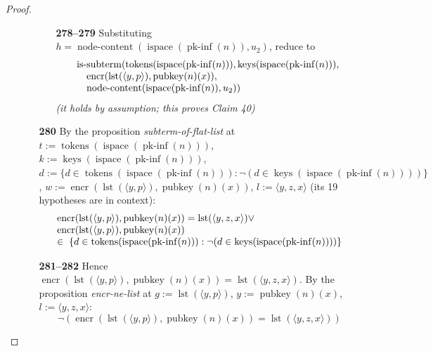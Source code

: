 \documentclass[11pt]{article}
\theoremstyle{plain}
\begin{document}
\begin{proof}
\begin{itemize}[leftmargin=2.8em, itemsep=4pt, parsep=1pt]
\begin{itemize}[leftmargin=2.8em, itemsep=4pt, parsep=1pt]
\begin{itemize}[leftmargin=2.8em, itemsep=4pt, parsep=1pt]
  \item[\textbf{278--279}] Substituting $h = \operatorname{node\text{-}content}(\operatorname{ispace}(\operatorname{pk\text{-}inf}(n)), u_{2})$, reduce to
\begin{equation*}
\begin{array}{@{}l@{}} \operatorname{is\text{-}subterm}(\operatorname{tokens}(\operatorname{ispace}(\operatorname{pk\text{-}inf}(n))), \operatorname{keys}(\operatorname{ispace}(\operatorname{pk\text{-}inf}(n))), \\ \quad \operatorname{encr}(\operatorname{lst}(\langle y, p \rangle), \operatorname{pubkey}(n)(x)), \\ \quad \operatorname{node\text{-}content}(\operatorname{ispace}(\operatorname{pk\text{-}inf}(n)), u_{2})) \end{array}
\end{equation*}
  \emph{(it holds by assumption; this proves Claim 40)}
  \end{itemize}
  \item[\textbf{280}] By the proposition \emph{subterm-of-flat-list} at $t := \operatorname{tokens}(\operatorname{ispace}(\operatorname{pk\text{-}inf}(n)))$, $k := \operatorname{keys}(\operatorname{ispace}(\operatorname{pk\text{-}inf}(n)))$, $d := \{d \in \operatorname{tokens}(\operatorname{ispace}(\operatorname{pk\text{-}inf}(n))) : \neg (d \in \operatorname{keys}(\operatorname{ispace}(\operatorname{pk\text{-}inf}(n))))\}$, $w := \operatorname{encr}(\operatorname{lst}(\langle y, p \rangle), \operatorname{pubkey}(n)(x))$, $l := \langle y, z, x \rangle$ (its 19 hypotheses are in context):
\begin{equation*}
\begin{array}{@{}l@{}} \operatorname{encr}(\operatorname{lst}(\langle y, p \rangle), \operatorname{pubkey}(n)(x)) = \operatorname{lst}(\langle y, z, x \rangle) \vee \\ \operatorname{encr}(\operatorname{lst}(\langle y, p \rangle), \operatorname{pubkey}(n)(x)) \\ \in\; \{d \in \operatorname{tokens}(\operatorname{ispace}(\operatorname{pk\text{-}inf}(n))) : \neg (d \in \operatorname{keys}(\operatorname{ispace}(\operatorname{pk\text{-}inf}(n))))\} \end{array}
\end{equation*}

  \item[\textbf{281--282}] Hence $\operatorname{encr}(\operatorname{lst}(\langle y, p \rangle), \operatorname{pubkey}(n)(x)) = \operatorname{lst}(\langle y, z, x \rangle)$. By the proposition \emph{encr-ne-list} at $g := \operatorname{lst}(\langle y, p \rangle)$, $y := \operatorname{pubkey}(n)(x)$, $l := \langle y, z, x \rangle$:
\begin{equation*}
\neg (\operatorname{encr}(\operatorname{lst}(\langle y, p \rangle), \operatorname{pubkey}(n)(x)) = \operatorname{lst}(\langle y, z, x \rangle))
\end{equation*}


\end{itemize}
\end{itemize}
\end{proof}
\end{document}
